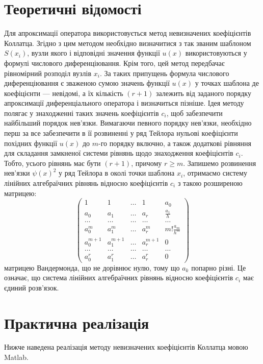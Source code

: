 \documentclass[titlepage]{article}
\begin{document}
\section{Теоретичні відомості}
Для апроксимації оператора використовується метод невизначених коефіцієнтів Коллатца. Згідно з цим методом необхідно визначитися з так званим шаблоном $S(x_i)$, вузли якого і відповідні значення функції $u(x)$ використовуються у формулі числового диференціювання. Крім того, цей метод передбачає рівномірний розподіл вузлів $x_i$. За таких припущень формула числового диференціювання є зваженою сумою значень функції $u(x)$ у точках шаблона де коефіцієнти --- невідомі, а їх кількість $(r + 1)$ залежить від заданого порядку апроксимації диференціального оператора і визначиться пізніше. Ідея методу полягає у знаходженні таких значень коефіцієнтів $c_i$, щоб забезпечити найбільший порядок нев'язки. Вимагаючи певного порядку нев'язки, необхідно перш за все забезпечити в її розвиненні у ряд Тейлора нульові коефіцієнти похідних функції $u(x)$ до $m$-го порядку включно, а також додаткові рівняння для складання замкненої системи рівнянь щодо знаходження коефіцієнтів $c_i$. Тобто, усього рівнянь має бути $(r + 1)$, причому $r \ge m$. Запишемо розвинення нев'язки
$\psi(x)^2$ у ряд Тейлора в околі точки шаблона $x_i$, отримаємо систему лінійних алгебраїчних рівнянь відносно коефіцієнтів $c_i$ з такою розширеною матрицею:
\begin{equation*}
\left(\begin{array}{cccc|c}
1&1&\ldots &1&a_0\\
a_0&a_1&\ldots&a_r&\frac{a_1}{h}\\
\ldots&\ldots&\ldots&\ldots&\ldots\\
a_0^m&a_1^m&\ldots&a_r^m&m!\frac{a_m}{h^m}\\
a_0^{m+1}&a_1^{m+1}&\ldots&a_r^{m+1}&0\\
\ldots&\ldots&\ldots&\ldots&\ldots\\
a_0^{r}&a_1^{r}&\ldots&a_r^{r}&0
\end{array}\right)
\end{equation*}
матрицею Вандермонда, що не дорівнює нулю, тому що $a_k$ попарно різні. Це означає, що система лінійних алгебраїчних рівнянь відносно коефіцієнтів $c_i$ має єдиний розв'язок.
\section{Практична реалізація}
Нижче наведена реалізація методу невизначених коефіцієнтів Коллатца мовою Matlab. 
\end{document}
